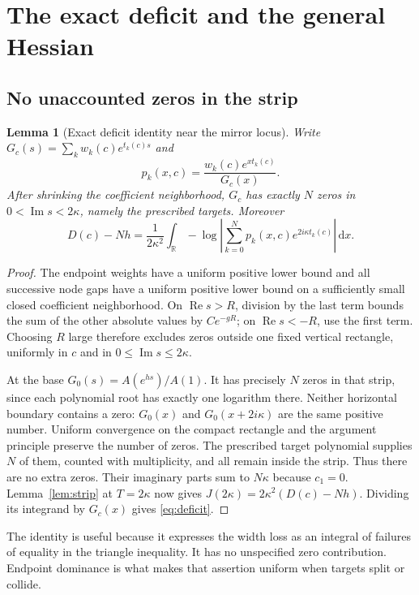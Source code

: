 \documentclass[11pt]{article}
\newtheorem{lemma}[theorem]{Lemma}
\theoremstyle{remark}\newtheorem{remark}[theorem]{Remark}
\newcommand{\R}{\mathbb R}\newcommand{\C}{\mathbb C}
\newcommand{\dd}{\,\mathrm d}\newcommand{\supp}{\operatorname{supp}}
\newcommand{\Rea}{\operatorname{Re}}\newcommand{\Ima}{\operatorname{Im}}
\newcommand{\abs}[1]{\left\lvert#1\right\rvert}
\begin{document}
\section{The exact deficit and the general Hessian}

\subsection{No unaccounted zeros in the strip}

\begin{lemma}[Exact deficit identity near the mirror locus]
\label{lem:deficit}
Write $G_c(s)=\sum_kw_k(c)e^{t_k(c)s}$ and
\[
 p_k(x,c)=\frac{w_k(c)e^{xt_k(c)}}{G_c(x)}.
\]
After shrinking the coefficient neighborhood, $G_c$ has exactly $N$ zeros
in $0<\Ima s<2\kappa$, namely the prescribed targets. Moreover
\begin{equation}\label{eq:deficit}
 D(c)-Nh=\frac1{2\kappa^2}\int_\R
 -\log\abs{\sum_{k=0}^N p_k(x,c)e^{2i\kappa t_k(c)}}\dd x.
\end{equation}
\end{lemma}

\begin{proof}
The endpoint weights have a uniform positive lower bound and all successive
node gaps have a uniform positive lower bound on a sufficiently small
closed coefficient neighborhood. On $\Rea s>R$, division by the last term
bounds the sum of the other absolute values by $Ce^{-gR}$; on
$\Rea s<-R$, use the first term. Choosing $R$ large therefore excludes
zeros outside one fixed vertical rectangle, uniformly in $c$ and in
$0\le\Ima s\le2\kappa$.

At the base $G_0(s)=A(e^{hs})/A(1)$. It has precisely $N$ zeros in that
strip, since each polynomial root has exactly one logarithm there.
Neither horizontal boundary contains a zero: $G_0(x)$ and
$G_0(x+2i\kappa)$ are the same positive number. Uniform convergence on
the compact rectangle and the argument principle preserve the number of
zeros. The prescribed target polynomial supplies $N$ of them, counted
with multiplicity, and all remain inside the strip. Thus there are no
extra zeros. Their imaginary parts sum to $N\kappa$ because $c_1=0$.
Lemma~\ref{lem:strip} at $T=2\kappa$ now gives
$J(2\kappa)=2\kappa^2(D(c)-Nh)$. Dividing its integrand by $G_c(x)$
gives \eqref{eq:deficit}.
\end{proof}

The identity is useful because it expresses the width loss as an integral
of failures of equality in the triangle inequality. It has no unspecified
zero contribution. Endpoint dominance is what makes that assertion uniform
when targets split or collide.
\end{document}
